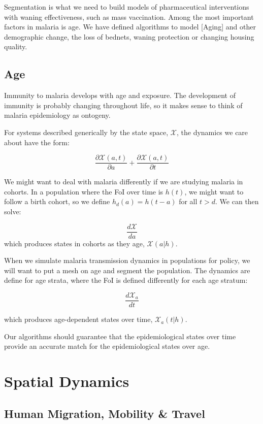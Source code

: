 \documentclass[
]{book}
\begin{document}
Segmentation is what we need to build models of pharmaceutical interventions with waning effectiveness, such as mass vaccination. Among the most important factors in malaria is age. We have defined algorithms to model {[}Aging{]} and other demographic change, the loss of bednets, waning protection or changing housing quality.

\subsection{Age}\label{age}

Immunity to malaria develops with age and exposure. The development of immunity is probably changing throughout life, so it makes sense to think of malaria epidemiology as ontogeny.

For systems described generically by the state space, \(\mathscr X\), the dynamics we care about have the form:

\[\frac{\partial {\mathscr X}(a,t)}{\partial a} + \frac{\partial {\mathscr X}(a,t)}{\partial t}\]

We might want to deal with malaria differently if we are studying malaria in cohorts. In a population where the FoI over time is \(h(t)\), we might want to follow a birth cohort, so we define \(h_d(a) = h(t-a)\) for all \(t>d\). We can then solve:

\[\frac{d{\mathscr X}}{d a} \]
which produces states in cohorts as they age, \({\mathscr X}(a|h).\)

When we simulate malaria transmission dynamics in populations for policy, we will want to put a mesh on age and segment the population. The dynamics are define for age strata, where the FoI is defined differently for each age stratum:

\[\frac{d{\mathscr X}_a}{d t}\]

which produces age-dependent states over time, \({\mathscr X}_a(t|h).\)

Our algorithms should guarantee that the epidemiological states over time provide an accurate match for the epidemiological states over age.

\section{Spatial Dynamics}\label{spatial-dynamics}

\subsection{Human Migration, Mobility \& Travel}\label{human-migration-mobility-travel}
\end{document}
